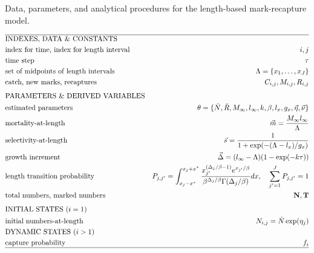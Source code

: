 \begin{table}
  \centering
\caption{Data, parameters, and analytical procedures for the length-based mark-recapture model.}\label{Table:LSMRmodel} 
\tableEq
    \begin{align}
        \hline
		&\mbox{INDEXES, DATA \& CONSTANTS} &\nonumber\\
		&\mbox{index for time, index for length interval} 
		&i,j \\
		&\mbox{time step}  & \tau\\
		&\mbox{set of midpoints of length intervals}
		&\Lambda = \{x_1, \ldots,x_J\}\\
		&\mbox{catch, new marks, recaptures} 
		&C_{i,j}, M_{i,j}, R_{i,j}\\[1ex]
		&\mbox{PARAMETERS \& DERIVED VARIABLES} &\nonumber\\
		&\mbox{estimated parameters} 
		&\theta=\{\dot{N},\bar{R},M_\infty,l_\infty,k,\beta,l_x,g_x,
			\vec{\eta},\vec{\nu} \}\\
		&\mbox{mortality-at-length} 
		& \vec{m} = \frac{M_\infty l_\infty}{\Lambda}\\
		&\mbox{selectivity-at-length} 
		& \vec{s} = \frac{1}{1+\exp(-(\Lambda-l_x)/g_x)}\\
		&\mbox{growth increment} 
		& \vec{\Delta} = (l_\infty-\Lambda)(1-\exp(-k \tau))  \\
		&\mbox{length transition probability}
		& P_{j,j'} =\int_{x_j-x^*}^{x_j+x^*} \frac{x_{j'}^{(\Delta_{j}/\beta-1)}
		e^{x_{j'}/\beta}}{\beta^{\Delta_{j}/\beta} \Gamma(\Delta_{j}/\beta)}dx, 
		\quad \sum_{j'=1}^J P_{j,j'}= 1 \\
		&\mbox{total numbers, marked numbers} 
		& \mathbf{N}, \mathbf{T}\\[1ex]
		&\mbox{INITIAL STATES ($i=1$)}  \nonumber\\
		&\mbox{initial numbers-at-length}\quad
		&N_{i,j} = \dot{N}\exp(\eta_j)\\
		&\mbox{DYNAMIC STATES ($i>1$)} \nonumber\\
		&\mbox{capture probability} 
		& f_i\\
		\hline \nonumber
    \end{align}
    \normalEq
\end{table}

